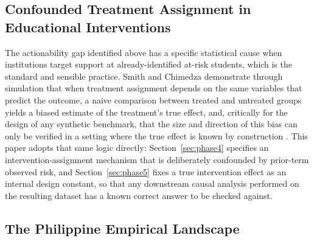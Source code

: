 \documentclass[11pt]{article}
\begin{document}
\subsection{Confounded Treatment Assignment in Educational Interventions}
\label{sec:related-C}

The actionability gap identified above has a specific statistical cause when institutions target support at already-identified at-risk students, which is the standard and sensible practice. Smith and Chimedza demonstrate through simulation that when treatment assignment depends on the same variables that predict the outcome, a naive comparison between treated and untreated groups yields a biased estimate of the treatment's true effect, and, critically for the design of any synthetic benchmark, that the size and direction of this bias can only be verified in a setting where the true effect is known by construction \citep{smith2021}. This paper adopts that same logic directly: Section~\ref{sec:phase4} specifies an intervention-assignment mechanism that is deliberately confounded by prior-term observed risk, and Section~\ref{sec:phase5} fixes a true intervention effect as an internal design constant, so that any downstream causal analysis performed on the resulting dataset has a known correct answer to be checked against.

\subsection{The Philippine Empirical Landscape}
\label{sec:related-D}
\end{document}
